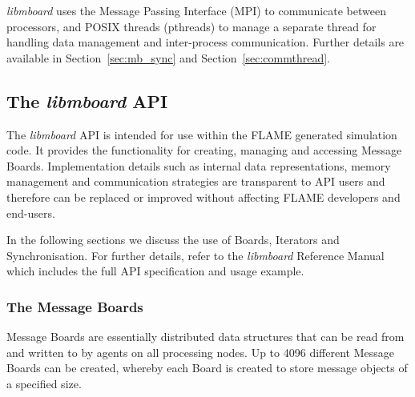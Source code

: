 \textit{libmboard} uses the Message Passing Interface (MPI) to communicate between processors, and POSIX threads (pthreads) to manage a separate thread for handling data management and inter-process communication. Further details are available in Section~\ref{sec:mb_sync} and Section~\ref{sec:commthread}.

\subsection{The \textit{libmboard} API}
\label{sec:mb_api}

The  \textit{libmboard} API is intended for use within the FLAME generated simulation code. It provides the functionality for creating, managing and accessing Message Boards. Implementation details such as internal data representations, memory management and communication strategies are transparent to API users and therefore can be replaced or improved without affecting FLAME developers and end-users.

In the following sections we discuss the use of Boards, Iterators and Synchronisation. For further details, refer to the \textit{libmboard} Reference Manual \cite{MessageBoardAPI} which includes the full API specification and usage example.


\subsubsection{The Message Boards}

Message Boards are essentially distributed data structures that can be read from and written to by agents on all processing nodes. Up to 4096 different Message Boards can be created, whereby each Board is created to store message objects of a specified size.

